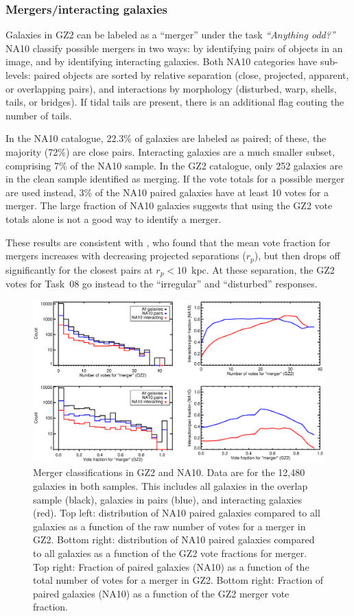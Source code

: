 \documentclass[useAMS,usenatbib]{mn2e}
\begin{document}
\subsubsection{Mergers/interacting galaxies}

Galaxies in GZ2 can be labeled as a ``merger'' under the task {\it ``Anything odd?''} NA10 classify possible mergers in two ways: by identifying pairs of objects in an image, and by identifying interacting galaxies. Both NA10 categories have sub-levels: paired objects are sorted by relative separation (close, projected, apparent, or overlapping pairs), and interactions by morphology (disturbed, warp, shells, tails, or bridges). If tidal tails are present, there is an additional flag couting the number of tails. 

In the NA10 catalogue, 22.3\% of galaxies are labeled as paired; of these, the majority (72\%) are close pairs. Interacting galaxies are a much smaller subset, comprising 7\% of the NA10 sample. In the GZ2 catalogue, only 252 galaxies are in the clean sample identified as merging. If the vote totals for a possible merger are used instead, 3\% of the NA10 paired galaxies have at least 10 votes for a merger. The large fraction of NA10 galaxies suggests that using the GZ2 vote totals alone is not a good way to identify a merger. 

These results are consistent with \citet{cas13}, who found that the mean vote fraction for mergers increases with decreasing projected separations ($r_p$), but then drops off significantly for the closest pairs at $r_p < 10$~kpc. At these separation, the GZ2 votes for Task~08 go instead to the ``irregular'' and ``disturbed'' responses. 

\begin{figure}
\includegraphics[angle=0,width=7.0in]{figures/na_pairs.eps}
\caption{Merger classifications in GZ2 and NA10. Data are for the 12,480 galaxies in both samples. This includes all galaxies in the overlap sample (black), galaxies in pairs (blue), and interacting galaxies (red). Top left: distribution of NA10 paired galaxies compared to all galaxies as a function of the raw number of votes for a merger in GZ2. Bottom right: distribution of NA10 paired galaxies compared to all galaxies as a function of the GZ2 vote fractions for merger. Top right: Fraction of paired galaxies (NA10) as a function of the total number of votes for a merger in GZ2. Bottom right: Fraction of paired galaxies (NA10) as a function of the GZ2 merger vote fraction. 
\label{fig-na_pairs}}
\end{figure}
\end{document}
